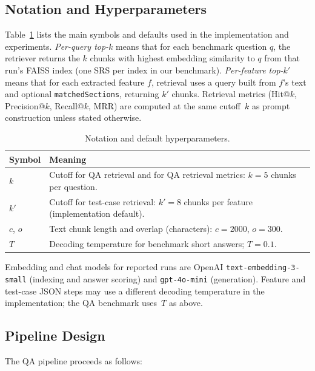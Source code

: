 \documentclass[conference]{IEEEtran}
\begin{document}
\subsection{Notation and Hyperparameters}
\label{sec:notation}

Table~\ref{tab:notation} lists the main symbols and defaults used in the implementation and experiments. \emph{Per-query top-$k$} means that for each benchmark question $q$, the retriever returns the $k$ chunks with highest embedding similarity to $q$ from that run's FAISS index (one SRS per index in our benchmark). \emph{Per-feature top-$k'$} means that for each extracted feature $f$, retrieval uses a query built from $f$'s text and optional \texttt{matchedSections}, returning $k'$ chunks. Retrieval metrics (Hit@$k$, Precision@$k$, Recall@$k$, MRR) are computed at the same cutoff~$k$ as prompt construction unless stated otherwise.

\begin{table}[t]
\centering
\caption{Notation and default hyperparameters.}
\label{tab:notation}
\begin{tabular}{@{}p{}p{}@{}}
\hline
Symbol & Meaning \\
\hline
$k$ & Cutoff for QA retrieval and for QA retrieval metrics: $k{=}5$ chunks per question. \\
$k'$ & Cutoff for test-case retrieval: $k'{=}8$ chunks per feature (implementation default). \\
$c$, $o$ & Text chunk length and overlap (characters): $c{=}2000$, $o{=}300$. \\
$T$ & Decoding temperature for benchmark short answers; $T{=}0.1$. \\
\hline
\end{tabular}
\end{table}

Embedding and chat models for reported runs are OpenAI \texttt{text-embedding-3-small} (indexing and answer scoring) and \texttt{gpt-4o-mini} (generation). Feature and test-case JSON steps may use a different decoding temperature in the implementation; the QA benchmark uses~$T$ as above.

\subsection{Pipeline Design}

The QA pipeline proceeds as follows:
\end{document}
